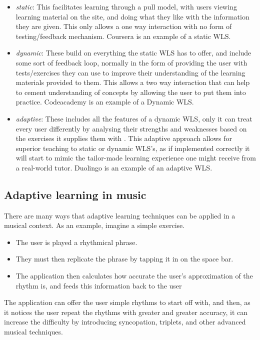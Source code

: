 	\begin{itemize}
	\item \emph{static}: This facilitates learning through a pull model, with users viewing learning material on the site, and doing what they like with the information they are given. This only allows a one way interaction with no form of testing/feedback mechanism. Coursera is an example of a static WLS.
		\item \emph{dynamic}: These build on everything the static WLS has to offer, and include some sort of feedback loop, normally in the form of providing the user with tests/exercises they can use to improve their understanding of the learning materials provided to them. This allows a two way interaction that can help to cement understanding of concepts by allowing the user to put them into practice. Codeacademy is an example of a Dynamic WLS.
		\item \emph{adaptive}: These includes all the features of a dynamic WLS, only it can treat every user differently by analysing their strengths and weaknesses based on the exercises it supplies them with \cite{duolingoDataDriven}. This adaptive approach allows for superior teaching to static or dynamic WLS's, as if implemented correctly it will start to mimic the tailor-made learning experience one might receive from a real-world  tutor. Duolingo is an example of an adaptive WLS.
	\end{itemize}

	
	\subsection{Adaptive learning in music}
		There are many ways that adaptive learning techniques can be applied in a musical context. As an example, imagine a simple exercise.
		\begin{itemize}
			\item The user is played a rhythmical phrase.
			\item They must then replicate the phrase by tapping it in on the space bar. 
			\item The application then calculates how accurate the user's approximation of the rhythm is, and feeds this information back to the user
		\end{itemize}
		The application can offer the user simple rhythms to start off with, and then, as it notices the user repeat the rhythms with greater and greater accuracy, it can increase the difficulty by introducing syncopation, triplets, and other advanced musical techniques.
		


